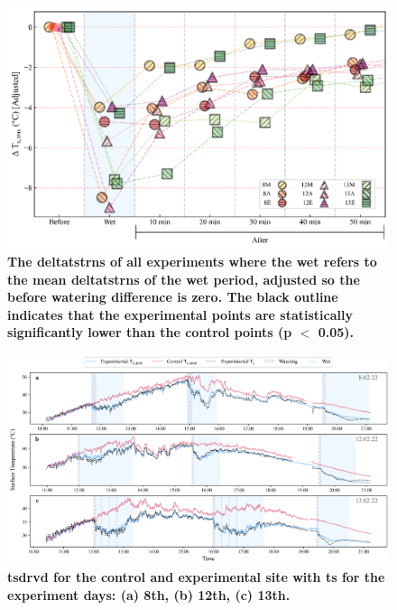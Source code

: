 \documentclass[final,3p,times,authoryear]{elsarticle}
\begin{document}

\begin{figure}
\centering
\includegraphics[trim={0 0 0 0},clip,scale=1.0]{pict045.png}
\caption{\bf The \gls{deltatstrns} of all experiments where the wet refers to the mean \gls{deltatstrns} of the wet period, adjusted so the before watering difference is zero. The black outline indicates that the experimental points are statistically significantly lower than the control points (\gls{p} $<$ 0.05).}
 \label{fig:7.16}
\end{figure}



\begin{figure}
\centering
\includegraphics[trim={0 0 0 0},clip,scale=1.0]{pict028.png}
\caption{\bf \gls{tsdrvd} for the control and experimental site with \gls{ts} for the experiment days: (a) 8th, (b) 12th, (c) 13th.}
 \label{fig:7.17}
\end{figure}
\end{document}
